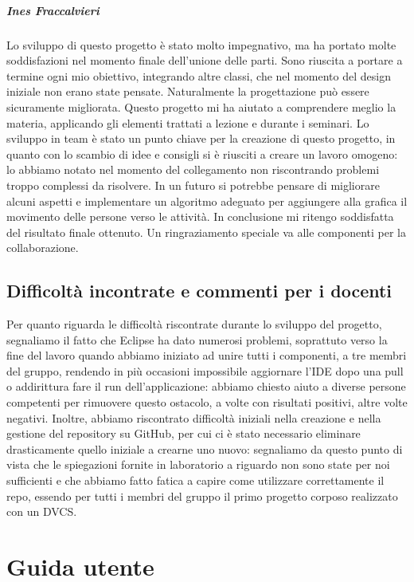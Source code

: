\documentclass[a4paper,12pt]{report}
\begin{document}
\paragraph{Ines Fraccalvieri} Lo sviluppo di questo progetto è stato molto impegnativo, ma ha portato molte soddisfazioni nel momento finale dell’unione delle parti. Sono riuscita a portare a termine ogni mio obiettivo, integrando altre classi, che nel momento del design iniziale non erano state pensate. Naturalmente la progettazione può essere sicuramente migliorata. Questo progetto mi ha aiutato a comprendere meglio la materia, applicando gli elementi trattati a lezione e durante i seminari. Lo sviluppo in team è stato un punto chiave per la creazione di questo progetto, in quanto con lo scambio di idee e consigli si è riusciti a creare un lavoro omogeno: lo abbiamo notato nel momento del collegamento non riscontrando problemi troppo complessi da risolvere. In un futuro si potrebbe pensare di migliorare alcuni aspetti e implementare un algoritmo adeguato per aggiungere alla grafica il movimento delle persone verso le attività. In conclusione mi ritengo soddisfatta del risultato finale ottenuto. 
Un ringraziamento speciale va alle componenti per la collaborazione.


\section{Difficoltà incontrate e commenti per i docenti}

Per quanto riguarda le difficoltà riscontrate durante lo sviluppo del progetto, segnaliamo il fatto che Eclipse ha dato numerosi problemi, soprattuto verso la fine del lavoro quando abbiamo iniziato ad unire tutti i componenti, a tre membri del gruppo, rendendo in più occasioni impossibile aggiornare l'IDE dopo una pull o addirittura fare il run dell'applicazione: abbiamo chiesto aiuto a diverse persone competenti per rimuovere questo ostacolo, a volte con risultati positivi, altre volte negativi.
Inoltre, abbiamo riscontrato difficoltà iniziali nella creazione e nella gestione del repository su GitHub, per cui ci è stato necessario eliminare drasticamente quello iniziale a crearne uno nuovo: segnaliamo da questo punto di vista che le spiegazioni fornite in laboratorio a riguardo non sono state per noi sufficienti e che abbiamo fatto fatica a capire come utilizzare correttamente il repo, essendo per tutti i membri del gruppo il primo progetto corposo realizzato con un DVCS.

\appendix
\chapter{Guida utente}
\end{document}

